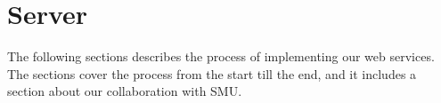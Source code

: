 \section{Server}
The following sections describes the process of implementing our web services. The sections cover the process from the start till the end, and it includes a section about our collaboration with SMU.





